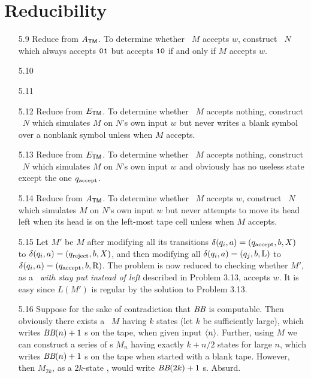 \section{Reducibility}

\begin{itemize}
	
	\item[5.9]
	Reduce from $A_{\TM}$. To determine whether \TM\ $M$ accepts $w$, construct \TM\ $N$ which always accepts $\TT{01}$ but accepts $\TT{10}$ if and only if $M$ accepts $w$.
	
	\item[5.10]
	\Omit
	
	\item[5.11]
	\Omit
	
	\item[5.12]
	Reduce from $E_{\TM}$. To determine whether \TM\ $M$ accepts nothing, construct \TM\ $N$ which simulates $M$ on $N$'s own input $w$ but never writes a blank symbol over a nonblank symbol unless when $M$ accepts.
	
	\item[5.13]
	Reduce from $E_{\TM}$. To determine whether \TM\ $M$ accepts nothing, construct \TM\ $N$ which simulates $M$ on $N$'s own input $w$ and obviously has no useless state except the one $q_{\RM{accept}}$.
	
	\item[5.14]
	Reduce from $A_{\TM}$. To determine whether \TM\ $M$ accepts $w$, construct \TM\ $N$ which simulates $M$ on $N$'s own input $w$ but never attempts to move its head left when its head is on the left-most tape cell unless when $M$ accepts.
	
	\item[5.15]
	Let $M'$ be $M$ after modifying all its transitions $\delta(q_i,a) = (q_{\RM{accept}},b,X)$ to $\delta(q_i,a) = (q_{\RM{reject}},b,X)$, and then modifying all $\delta(q_i,a) = (q_j,b,\RM{L})$ to $\delta(q_i,a) = (q_{\RM{accept}},b,\RM{R})$. The problem is now reduced to checking whether $M'$, as a \emph{\TM\ with stay put instead of left} described in Problem 3.13, accepts $w$. It is easy since $L(M')$ is regular by the solution to Problem 3.13.
	
	\item[5.16]
	Suppose for the sake of contradiction that $\IT{BB}$ is computable. Then obviously there exists a \TM\ $M$ having $k$ states (let $k$ be sufficiently large), which writes $\IT{BB}(n) + 1$ s on the tape, when given input $\Bra{n}$. Further, using $M$ we can construct a series of \TM s $M_n$ having exactly $k+n/2$ states for large $n$, which writes $\IT{BB}(n) + 1$ s on the tape when started with a blank tape. However, then $M_{2k}$, as a $2k$-state \TM , would write $\IT{BB}(2k) + 1$ s. Absurd.
	

\end{itemize}
